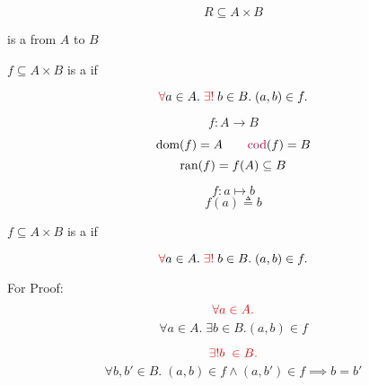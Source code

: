 
\begin{frame}{}
  \begin{center}
  \end{center}
\end{frame}

\begin{frame}{}
  \[
    R \subseteq A \times B
  \]

  \begin{center}
    is a  from $A$ to $B$
  \end{center}
\end{frame}

\begin{frame}{}
  \begin{definition}[Function]
    $f \subseteq A \times B$ is a   if

    \[
      \textcolor{red}{\forall} a \in A.\; \textcolor{red}{\exists!} \;b \in B.\; (a, b) \in f.
    \]
  \end{definition}

  \pause
  \[
    f: A \to B
  \]

  \pause
  \[
    \text{dom}(f) = A \qquad \textcolor{purple}{\text{cod}}(f) = B
  \]
  \[
    \text{ran}(f) = f(A) \subseteq B
  \]

  \pause
  \[
    f: a \mapsto b
  \]
  \[
    f(a) \triangleq b
  \]
\end{frame}

\begin{frame}{}
  \begin{definition}[Function]
    $f \subseteq A \times B$ is a   if

    \[
      \textcolor{red}{\forall} a \in A.\; \textcolor{red}{\exists!} \;b \in B.\; (a, b) \in f.
    \]
  \end{definition}

  \vspace{0.30cm}
  \begin{alertblock}{For Proof:}
    \pause
    \[
      \textcolor{red}{\forall a \in A.}
    \]
    \[
      \forall a \in A.\; \exists b \in B. (a, b) \in f
    \]

    \pause
    \[
      \textcolor{red}{\exists! b \;\in B.}
    \]
    \[
      \forall b, b' \in B.\; (a, b) \in f \land (a, b') \in f \implies b = b'
    \]
  \end{alertblock}
\end{frame}

